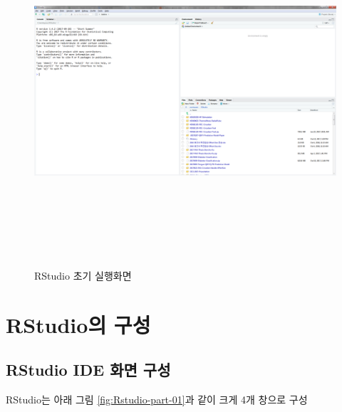 \documentclass[11pt,a4paper]{book}
\theoremstyle{definition}
\theoremstyle{definition}
\theoremstyle{definition}
\theoremstyle{remark}
\begin{document}
\begin{figure}[H]
{
  \centering
  \includegraphics[width = 15cm, height = 13cm]{Figures/Rstudio-init.png}
  \caption[RStudio 초기 실행화면]{RStudio 초기 실행화면}\label{fig:Rstudio-install-05}
}
\end{figure}

\section{RStudio의 구성}\label{rstudio-}

\subsection{RStudio IDE 화면 구성}\label{rstudio-ide--}

RStudio는 아래 그림 \ref{fig:Rstudio-part-01}과 같이 크게 4개 창으로
구성
\end{document}
